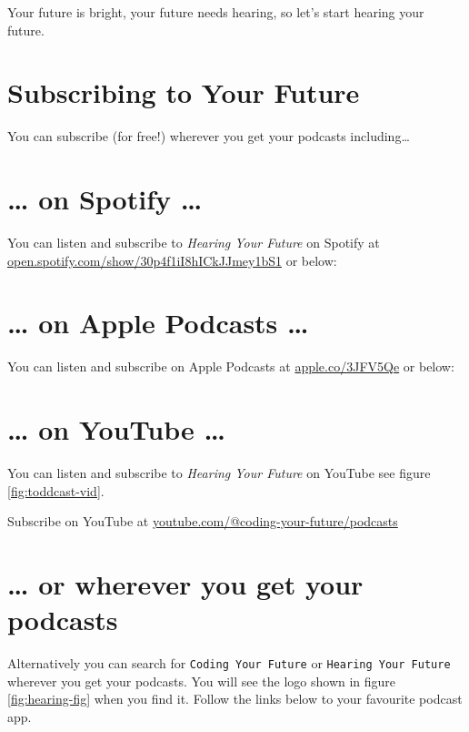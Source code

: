 \documentclass[
  12pt,
]{book}
\begin{document}
Your future is bright, your future needs hearing, so let's start hearing your future.

\section{Subscribing to Your Future}\label{subscribing}

You can subscribe (for free!) wherever you get your podcasts including\ldots{}

\section{\ldots{} on Spotify \ldots{}}\label{spotify}

You can listen and subscribe to \emph{Hearing Your Future} on Spotify at \href{https://open.spotify.com/show/30p4f1iI8hICkJJmey1bS1}{open.spotify.com/show/30p4f1iI8hICkJJmey1bS1} or below:

\section{\ldots{} on Apple Podcasts \ldots{}}\label{apple}

You can listen and subscribe on Apple Podcasts at \href{https://apple.co/3JFV5Qe}{apple.co/3JFV5Qe} or below:

\section{\ldots{} on YouTube \ldots{}}\label{youtube}

You can listen and subscribe to \emph{Hearing Your Future} on YouTube see figure \ref{fig:toddcast-vid}.

\label{fig:toddcast-vid}Subscribe on YouTube at \href{https://www.youtube.com/@coding-your-future/podcasts}{youtube.com/@coding-your-future/podcasts}



\section{\ldots{} or wherever you get your podcasts}\label{wherever}

Alternatively you can search for \texttt{Coding\ Your\ Future} or \texttt{Hearing\ Your\ Future} wherever you get your podcasts. You will see the logo shown in figure \ref{fig:hearing-fig} when you find it. Follow the links below to your favourite podcast app.
\end{document}
